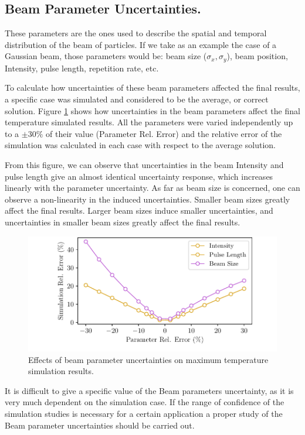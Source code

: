 \subsection{Beam Parameter Uncertainties.}

These parameters are the ones used to describe the spatial and temporal distribution of the beam of particles. If we take as an example the case of a Gaussian beam, those parameters would be: beam size ($\sigma_x , \sigma_y$), beam position, Intensity, pulse length, repetition rate, etc. 

To calculate how uncertainties of these beam parameters affected the final results, a specific case was simulated and considered to be the average, or correct solution. Figure \ref{fig:BeamParUnc} shows how uncertainties in the beam parameters affect the final temperature simulated results. All the parameters were varied independently up to a $\pm 30\%$ of their value (Parameter Rel. Error)  and the relative error of the simulation was calculated in each case with respect to the average solution. 

From this figure, we can observe that uncertainties in the beam Intensity and pulse length give an almost identical uncertainty response, which increases linearly with the parameter uncertainty. As far as beam size is concerned, one can observe a non-linearity in the induced uncertainties. Smaller beam sizes greatly affect the final results. Larger beam sizes induce smaller uncertainties, and uncertainties in smaller beam sizes greatly affect the final results. 
\begin{figure}[h]
    \centering
    \includegraphics[width=1.0\columnwidth]{BeamParameterUncertainty/BeamParUnc.pdf}
    \caption{Effects of beam parameter uncertainties on maximum temperature simulation results.}
    \label{fig:BeamParUnc}
\end{figure}

It is difficult to give a specific value of the Beam parameters uncertainty, as it is very much dependent on the simulation case. If the range of confidence of the simulation studies is necessary for a certain application a proper study of the Beam parameter uncertainties should be carried out. 

